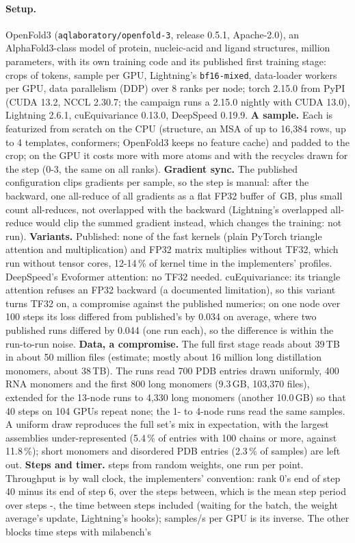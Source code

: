 \paragraph{Setup.} OpenFold3 (\texttt{aqlaboratory/openfold-3}, release 0.5.1, Apache-2.0), an AlphaFold3-class model of protein, nucleic-acid and ligand structures, \TriOfParams{} million parameters, with its own training code and its published first training stage: crops of \TriOfCrop{} tokens, \TriOfBatch{} sample per GPU, Lightning's \texttt{bf16-mixed}, \TriOfWorkers{} data-loader workers per GPU, data parallelism (DDP) over 8 ranks per node; torch 2.15.0 from PyPI (CUDA 13.2, NCCL 2.30.7; the campaign runs a 2.15.0 nightly with CUDA 13.0), Lightning 2.6.1, cuEquivariance 0.13.0, DeepSpeed 0.19.9. \textbf{A sample.} Each is featurized from scratch on the CPU (structure, an MSA of up to 16,384 rows, up to 4 templates, conformers; OpenFold3 keeps no feature cache) and padded to the crop; on the GPU it costs more with more atoms and with the recycles drawn for the step (0-3, the same on all ranks). \textbf{Gradient sync.} The published configuration clips gradients per sample, so the step is manual: after the backward, one all-reduce of all gradients as a flat FP32 buffer of \TriOfBuffer\,GB, plus small count all-reduces, not overlapped with the backward (Lightning's overlapped all-reduce would clip the summed gradient instead, which changes the training: not run). \textbf{Variants.} Published: none of the fast kernels (plain PyTorch triangle attention and multiplication) and FP32 matrix multiplies without TF32, which run without tensor cores, 12-14\,\% of kernel time in the implementers' profiles. DeepSpeed's Evoformer attention: no TF32 needed. cuEquivariance: its triangle attention refuses an FP32 backward (a documented limitation), so this variant turns TF32 on, a compromise against the published numerics; on one node over 100 steps its loss differed from published's by 0.034 on average, where two published runs differed by 0.044 (one run each), so the difference is within the run-to-run noise. \textbf{Data, a compromise.} The full first stage reads about 39\,TB in about 50 million files (estimate; mostly about 16 million long distillation monomers, about 38\,TB). The runs read 700 PDB entries drawn uniformly, 400 RNA monomers and the first 800 long monomers (9.3\,GB, 103,370 files), extended for the 13-node runs to 4,330 long monomers (another 10.0\,GB) so that 40 steps on 104 GPUs repeat none; the 1- to 4-node runs read the same samples. A uniform draw reproduces the full set's mix in expectation, with the largest assemblies under-represented (5.4\,\% of entries with 100 chains or more, against 11.8\,\%); short monomers and disordered PDB entries (2.3\,\% of samples) are left out. \textbf{Steps and timer.} \TriOfSteps{} steps from random weights, one run per point. Throughput is by wall clock, the implementers' convention: rank 0's end of step 40 minus its end of step 6, over the \TriOfMeasured{} steps between, which is the mean step period over steps \TriOfFrom-\TriOfSteps{}, the time between steps included (waiting for the batch, the weight average's update, Lightning's hooks); samples/s per GPU is its inverse. The other blocks time steps with milabench's 